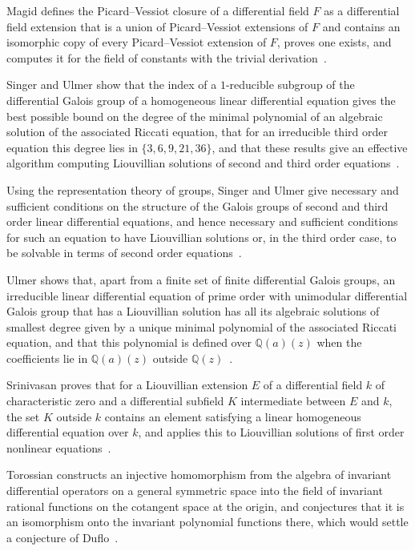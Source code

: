 Magid defines the Picard--Vessiot closure of a differential field $F$ as a differential field extension that is a union of Picard--Vessiot extensions of $F$ and contains an isomorphic copy of every Picard--Vessiot extension of $F$, proves one exists, and computes it for the field of constants with the trivial derivation~\cite{WlThePicardVessiotClosureInDiffe2002}.

Singer and Ulmer show that the index of a $1$-reducible subgroup of the differential Galois group of a homogeneous linear differential equation gives the best possible bound on the degree of the minimal polynomial of an algebraic solution of the associated Riccati equation, that for an irreducible third order equation this degree lies in $\{3,6,9,21,36\}$, and that these results give an effective algorithm computing Liouvillian solutions of second and third order equations~\cite{WlLiouvillianAndAlgebraicSolutio1993}.

Using the representation theory of groups, Singer and Ulmer give necessary and sufficient conditions on the structure of the Galois groups of second and third order linear differential equations, and hence necessary and sufficient conditions for such an equation to have Liouvillian solutions or, in the third order case, to be solvable in terms of second order equations~\cite{WlGaloisGroupsOfSecondAndThirdOr1993}.

Ulmer shows that, apart from a finite set of finite differential Galois groups, an irreducible linear differential equation of prime order with unimodular differential Galois group that has a Liouvillian solution has all its algebraic solutions of smallest degree given by a unique minimal polynomial of the associated Riccati equation, and that this polynomial is defined over $\mathbb{Q}(a)(z)$ when the coefficients lie in $\mathbb{Q}(a)(z)$ outside $\mathbb{Q}(z)$~\cite{WlIrreducibleLinearDifferentialE1994}.

Srinivasan proves that for a Liouvillian extension $E$ of a differential field $k$ of characteristic zero and a differential subfield $K$ intermediate between $E$ and $k$, the set $K$ outside $k$ contains an element satisfying a linear homogeneous differential equation over $k$, and applies this to Liouvillian solutions of first order nonlinear equations~\cite{WlLiouvillianSolutionsOfFirstOrd2017}.

Torossian constructs an injective homomorphism from the algebra of invariant differential operators on a general symmetric space into the field of invariant rational functions on the cotangent space at the origin, and conjectures that it is an isomorphism onto the invariant polynomial functions there, which would settle a conjecture of Duflo~\cite{WlInvariantDifferentialOperators1993}.

